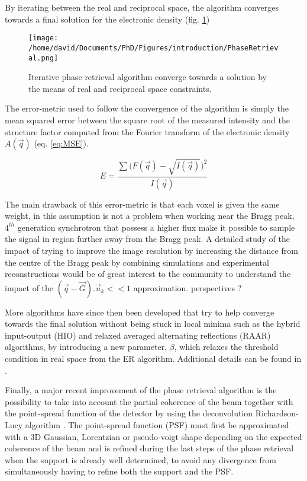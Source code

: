 By iterating between the real and reciprocal space, the algorithm converges towards a final solution for the electronic density (fig. \ref{fig:PRAlgo})

\begin{figure}[!htb]
   \centering
   \texttt{[image: /home/david/Documents/PhD/Figures/introduction/PhaseRetrieval.png]}
   \caption{
   Iterative phase retrieval algorithm converge towards a solution by the means of real and reciprocal space constraints.
   }
   \label{fig:PRAlgo}
\end{figure}

The error-metric used to follow the convergence of the algorithm is simply the mean squared error between the square root of the measured intensity and the structure factor computed from the Fourier transform of the electronic density $A(\vec{q})$ (eq. \ref{eq:MSE}).

\begin{equation}
    \label{eq:MSE}
    E = \frac{\sum \big( F(\vec{q}) - \sqrt{I(\vec{q})}  \big)^2}{I(\vec{q})}
\end{equation}

The main drawback of this error-metric is that each voxel is given the same weight, in this assumption is not a problem when working near the Bragg peak, $4^{th}$ generation synchrotron that possess a higher flux make it possible to sample the signal in region further away from the Bragg peak.
A detailed study of the impact of trying to improve the image resolution by increasing the distance from the centre of the Bragg peak by combining simulations and experimental reconstructions would be of great interest to the community to understand the impact of the $(\vec{q}-\vec{G}).\vec{u}_k<<1$ approximation.
\textcolor{Important}{perspectives ?}

More algorithms have since then been developed that try to help converge towards the final solution without being stuck in local minima such as the hybrid input-output (HIO) and relaxed averaged alternating reflections (RAAR) algorithms, by introducing a new parameter, $\beta$, which relaxes the threshold condition in real space from the ER algorithm.
Additional details can be found in \cite{Marchesini2003,Luke2005,Marchesini2007}.

Finally, a major recent improvement of the phase retrieval algorithm is the possibility to take into account the partial coherence of the beam together with the point-spread function of the detector by using the deconvolution Richardson-Lucy algorithm \parencite{Richardson1972, LucyAlgo1974, Fish1995, Clark2012}.
The point-spread function (PSF) must first be approximated with a 3D Gaussian, Lorentzian or pseudo-voigt shape depending on the expected coherence of the beam and is refined during the last steps of the phase retrieval when the support is already well determined, to avoid any divergence from simultaneously having to refine both the support and the PSF.

